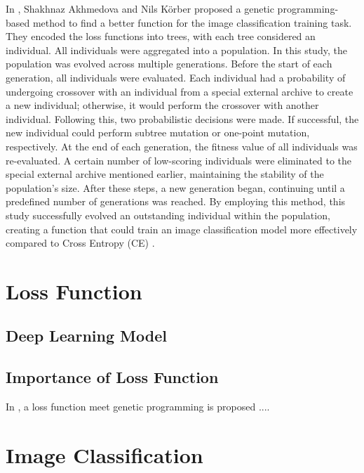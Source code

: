 \begin{ZhChapter}
    In \cite{akhmedova2024generationlossfunctionimage}, Shakhnaz Akhmedova and Nils Körber proposed a genetic programming-based method to find a better function for the image classification training task. They encoded the loss functions into trees, with each tree considered an individual. All individuals were aggregated into a population. In this study, the population was evolved across multiple generations. Before the start of each generation, all individuals were evaluated. Each individual had a probability of undergoing crossover with an individual from a special external archive to create a new individual; otherwise, it would perform the crossover with another individual. Following this, two probabilistic decisions were made. If successful, the new individual could perform subtree mutation or one-point mutation, respectively. At the end of each generation, the fitness value of all individuals was re-evaluated. A certain number of low-scoring individuals were eliminated to the special external archive mentioned earlier, maintaining the stability of the population's size. After these steps, a new generation began, continuing until a predefined number of generations was reached.  By employing this method, this study successfully evolved an outstanding individual within the population, creating a function that could train an image classification model more effectively compared to Cross Entropy (CE) \cite{zhang2018generalized}.

    \section{Loss Function}

    \subsection{Deep Learning Model}

    \subsection{Importance of Loss Function}
    In \cite{gonzalez2020improvedtrainingspeedaccuracy}, a loss function meet genetic programming is proposed ....
    \section{Image Classification}



\end{ZhChapter}
